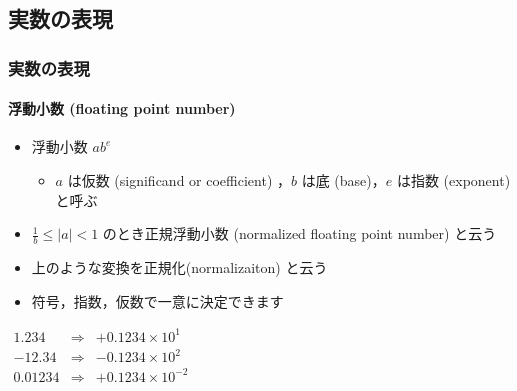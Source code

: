 \subsection{実数の表現}
\begin{frame}[shrink]
\frametitle{実数の表現}
\framesubtitle{浮動小数 (floating point number)}
  \begin{itemize}
\item 浮動小数 \(ab^{e}\)
    \begin{itemize}
\item $a$ は仮数 (significand or coefficient) ，$b$ は底 (base)，$e$ は指数 (exponent) と呼ぶ
    \end{itemize}
\item \(\frac{1}{b}\leq|a|<1\) のとき正規浮動小数 (normalized floating point number) と云う
\item 上のような変換を正規化(normalizaiton) と云う
\item 符号，指数，仮数で一意に決定できます
  \end{itemize}
  \begin{example}[正規浮動小数]
   \begin{math}
    \begin{array}{rcl}
1.234 &\Rightarrow& +0.1234\times 10^1\\
-12.34 &\Rightarrow& -0.1234\times 10^2\\
0.01234 &\Rightarrow& +0.1234\times 10^{-2}\\
    \end{array}
   \end{math}
  \end{example}
\end{frame}
